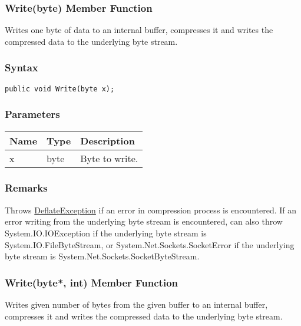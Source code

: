 \documentclass[a4paper,oneside,11.000000pt]{book}
\begin{document}
\hypertarget{System.IO.Compression.DeflateStream.Write.P.System.IO.Compression.DeflateStream.byte}{\subsubsection*{Write(byte) Member Function}}
\begin{flushleft}
Writes one byte of data to an internal buffer, compresses it and writes the compressed data
to the underlying byte stream.

\end{flushleft}
\subsubsection*{Syntax}\texttt{public void Write(byte x);}

\subsubsection*{Parameters}
\begin{flushleft}
\begin{supertabular}[l]{lll}
\textbf{Name}
& \textbf{Type}
& \textbf{Description}
\\
\hline
x
& byte
& Byte to write.

\\
\end{supertabular}

\end{flushleft}
\subsubsection*{Remarks}
\begin{flushleft}
Throws \hyperlink{System.IO.Compression.DeflateException}{DeflateException} if an error in compression process is encountered.
If an error writing from the underlying byte stream is encountered, 
can also throw System.\-IO.\-IOException if the underlying byte stream is System.\-IO.\-FileByteStream, or
System.\-Net.\-Sockets.\-SocketError if the underlying byte stream is System.\-Net.\-Sockets.\-SocketByteStream.

\end{flushleft}
\clearpage

\hypertarget{System.IO.Compression.DeflateStream.Write.P.System.IO.Compression.DeflateStream.P.byte.int}{\subsubsection*{Write(byte*, int) Member Function}}
\begin{flushleft}
Writes given number of bytes from the given buffer to an internal buffer, 
compresses it and writes the compressed data to the underlying byte stream.

\end{flushleft}
\end{document}
